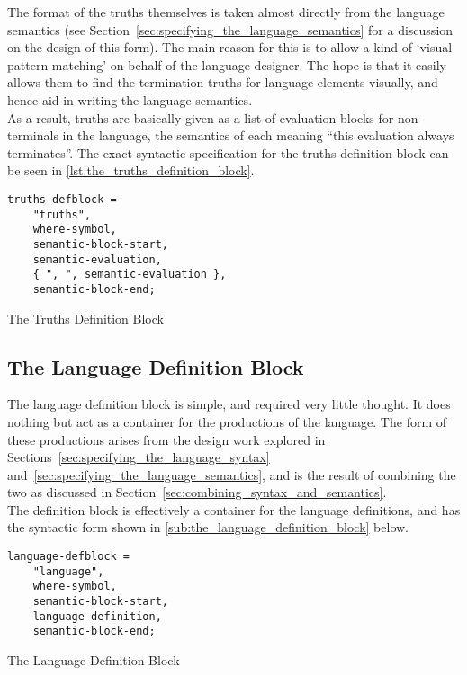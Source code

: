 The format of the truths themselves is taken almost directly from the language semantics (see Section~\ref{sec:specifying_the_language_semantics} for a discussion on the design of this form).
The main reason for this is to allow a kind of `visual pattern matching' on behalf of the language designer. 
The hope is that it easily allows them to find the termination truths for language elements visually, and hence aid in writing the language semantics.\\

As a result, truths are basically given as a list of evaluation blocks for non-terminals in the language, the semantics of each meaning ``this evaluation always terminates''. 
The exact syntactic specification for the truths definition block can be seen in \autoref{lst:the_truths_definition_block}. 

\begin{listing}[!htb]
\begin{verbatim}
truths-defblock =
    "truths",
    where-symbol, 
    semantic-block-start,
    semantic-evaluation,
    { ", ", semantic-evaluation },
    semantic-block-end;
\end{verbatim}
\caption{The Truths Definition Block}
\label{lst:the_truths_definition_block}
\end{listing}


\subsection{The Language Definition Block} %
\label{sub:the_language_definition_block}
The language definition block is simple, and required very little thought. 
It does nothing but act as a container for the productions of the language.
The form of these productions arises from the design work explored in Sections~\ref{sec:specifying_the_language_syntax} and~\ref{sec:specifying_the_language_semantics}, and is the result of combining the two as discussed in Section~\ref{sec:combining_syntax_and_semantics}.\\

The definition block is effectively a container for the language definitions, and has the syntactic form shown in \autoref{sub:the_language_definition_block} below.

\begin{listing}[!htb]
\begin{verbatim}
language-defblock =
    "language",
    where-symbol,
    semantic-block-start,
    language-definition,
    semantic-block-end;
\end{verbatim}
\caption{The Language Definition Block}
\label{lst:the_language_definition_block}
\end{listing}

